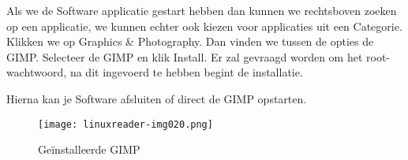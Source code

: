 Als we de Software applicatie gestart hebben dan kunnen we
rechtsboven zoeken op een applicatie, we kunnen echter ook kiezen voor applicaties uit een Categorie. Klikken
we op Graphics \& Photography. Dan vinden we tussen de opties de GIMP. Selecteer de GIMP en klik Install. Er zal
gevraagd worden om het root-wachtwoord, na dit ingevoerd te hebben begint de installatie.

Hierna kan je Software afsluiten of direct de GIMP opstarten.

\begin{figure}
\texttt{[image: linuxreader-img020.png]}
	\caption{Ge\"installeerde GIMP}
	\label{fig:de_software_gimp}
\end{figure}

